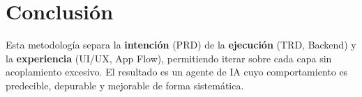 \documentclass[12pt,a4paper]{article}
\begin{document}
\section{Conclusión}

Esta metodología separa la \textbf{intención} (PRD) de la \textbf{ejecución} (TRD, Backend) y la \textbf{experiencia} (UI/UX, App Flow), permitiendo iterar sobre cada capa sin acoplamiento excesivo. El resultado es un agente de IA cuyo comportamiento es predecible, depurable y mejorable de forma sistemática.
\end{document}
